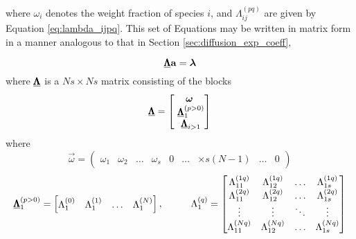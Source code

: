 where $\omega_i$ denotes the weight fraction of species $i$, and $\Lambda_{ij}^{(pq)}$ are given by Equation \eqref{eq:lambda_ijpq}. This set of Equations may be written in matrix form in a manner analogous to that in Section \ref{sec:diffusion_exp_coeff},

\begin{equation}
    \underline{\pmb{\Lambda}} \boldsymbol{\mathrm{a}} = \boldsymbol{\mathrm{\lambda}}
\end{equation}
where $\underline{\pmb{\Lambda}}$ is a $Ns \times Ns$ matrix consisting of the blocks
\begin{equation}
    \Mat{\Lambda} = \begin{bmatrix} \Vec{\omega} \\ \Mat{\Lambda}_1^{(p > 0)} \\ \Mat{\Lambda}_{i > 1}\end{bmatrix}
\end{equation}
where 
\begin{equation}
    \Vec{\omega} = \begin{pmatrix} \omega_1 & \omega_2 & \hdots & \omega_s & 0 & \hdots & \times s(N - 1) & \hdots & 0 \end{pmatrix}
\end{equation}
\begin{equation}
    \underline{\pmb{\Lambda}}_1^{(p > 0)} = 
    \begin{bmatrix}
        \Lambda_{1}^{(0)} & \Lambda_{1}^{(1)} & \hdots & \Lambda_{1}^{(N)}
    \end{bmatrix}
    ,\hspace{1cm}
    \Lambda_{1}^{(q)} = 
    \begin{bmatrix}
        \Lambda_{11}^{(1q)} & \Lambda_{12}^{(1q)} & \hdots & \Lambda_{1s}^{(1q)} \\
        \Lambda_{11}^{(2q)} & \Lambda_{12}^{(2q)} & \hdots & \Lambda_{1s}^{(2q)} \\
        \vdots & \vdots & \ddots & \vdots \\
        \Lambda_{11}^{(Nq)} & \Lambda_{12}^{(Nq)} & \hdots & \Lambda_{1s}^{(Nq)}
    \end{bmatrix}
\end{equation}
